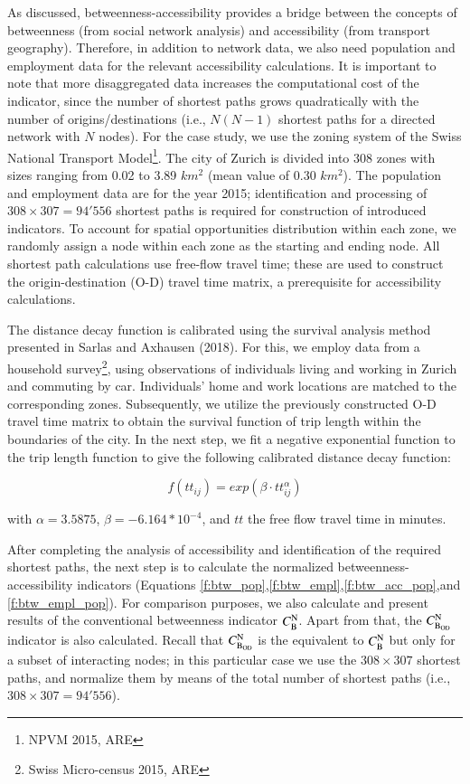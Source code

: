 \documentclass[]{elsarticle} %
\begin{document}
As discussed, betweenness-accessibility provides a bridge between the
concepts of betweenness (from social network analysis) and accessibility
(from transport geography). Therefore, in addition to network data, we
also need population and employment data for the relevant accessibility
calculations. It is important to note that more disaggregated data
increases the computational cost of the indicator, since the number of
shortest paths grows quadratically with the number of
origins/destinations (i.e., \(N(N-1)\) shortest paths for a directed
network with \(N\) nodes). For the case study, we use the zoning system
of the Swiss National Transport Model\footnote{NPVM 2015, ARE}. The city
of Zurich is divided into 308 zones with sizes ranging from 0.02 to 3.89
\(km^2\) (mean value of 0.30 \(km^2\)). The population and employment
data are for the year 2015; identification and processing of
\(308\times307=94'556\) shortest paths is required for construction of
introduced indicators. To account for spatial opportunities distribution
within each zone, we randomly assign a node within each zone as the
starting and ending node. All shortest path calculations use free-flow
travel time; these are used to construct the origin-destination (O-D)
travel time matrix, a prerequisite for accessibility calculations.

The distance decay function is calibrated using the survival analysis
method presented in Sarlas and Axhausen (2018). For this, we employ data
from a household survey\footnote{Swiss Micro-census 2015, ARE}, using
observations of individuals living and working in Zurich and commuting
by car. Individuals' home and work locations are matched to the
corresponding zones. Subsequently, we utilize the previously constructed
O-D travel time matrix to obtain the survival function of trip length
within the boundaries of the city. In the next step, we fit a negative
exponential function to the trip length function to give the following
calibrated distance decay function:

\[
f(tt_{ij})=exp({{\beta} \cdot tt_{ij}^{\alpha}})
\]

with \({\alpha}=3.5875\), \({\beta}=-6.164*10^{-4}\), and \(tt\) the
free flow travel time in minutes.

After completing the analysis of accessibility and identification of the
required shortest paths, the next step is to calculate the normalized
betweenness-accessibility indicators (Equations
\ref{f:btw_pop},\ref{f:btw_empl},\ref{f:btw_acc_pop},and
\ref{f:btw_empl_pop}). For comparison purposes, we also calculate and
present results of the conventional betweenness indicator
\(C_{\rm B}^{\rm N}\). Apart from that, the \(C_{\rm B_{OD}}^{\rm N}\)
indicator is also calculated. Recall that \(C_{\rm B_{OD}}^{\rm N}\) is
the equivalent to \(C_{\rm B}^{\rm N}\) but only for a subset of
interacting nodes; in this particular case we use the \(308\times 307\)
shortest paths, and normalize them by means of the total number of
shortest paths (i.e., \(308\times 307=94'556\)).
\end{document}

